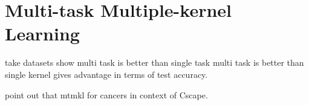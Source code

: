 \section{Multi-task Multiple-kernel Learning}

take datasets show multi task is better than single task
multi task is better than single kernel
gives advantage in terms of test accuracy.

point out that mtmkl for cancers in context of Cscape.
